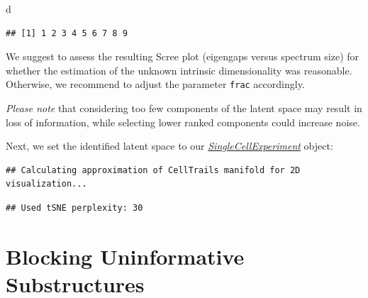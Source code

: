 \documentclass[]{book}
\newenvironment{Shaded}{\begin{snugshade}}{\end{snugshade}}
\newcommand{\KeywordTok}[1]{\textcolor[rgb]{0.13,0.29,0.53}{\textbf{#1}}}
\newcommand{\StringTok}[1]{\textcolor[rgb]{0.31,0.60,0.02}{#1}}
\newcommand{\OperatorTok}[1]{\textcolor[rgb]{0.81,0.36,0.00}{\textbf{#1}}}
\newcommand{\NormalTok}[1]{#1}
\theoremstyle{definition}
\theoremstyle{definition}
\theoremstyle{definition}
\theoremstyle{remark}
\begin{document}
\begin{Shaded}
\begin{Highlighting}[]
\NormalTok{d}
\end{Highlighting}
\end{Shaded}

\begin{verbatim}
## [1] 1 2 3 4 5 6 7 8 9
\end{verbatim}

We suggest to assess the resulting Scree plot (eigengaps versus spectrum
size) for whether the estimation of the unknown intrinsic dimensionality
was reasonable. Otherwise, we recommend to adjust the parameter
\texttt{frac} accordingly.

\emph{Please note} that considering too few components of the latent
space may result in loss of information, while selecting lower ranked
components could increase noise.

Next, we set the identified latent space to our
\emph{\href{http://bioconductor.org/packages/SingleCellExperiment}{SingleCellExperiment}}
object:

\begin{Shaded}
\end{Shaded}

\begin{verbatim}
## Calculating approximation of CellTrails manifold for 2D visualization...
\end{verbatim}

\begin{verbatim}
## Used tSNE perplexity: 30
\end{verbatim}

\hypertarget{S-blockSubstructures}{\section{Blocking Uninformative
Substructures}\label{S-blockSubstructures}}
\end{document}
